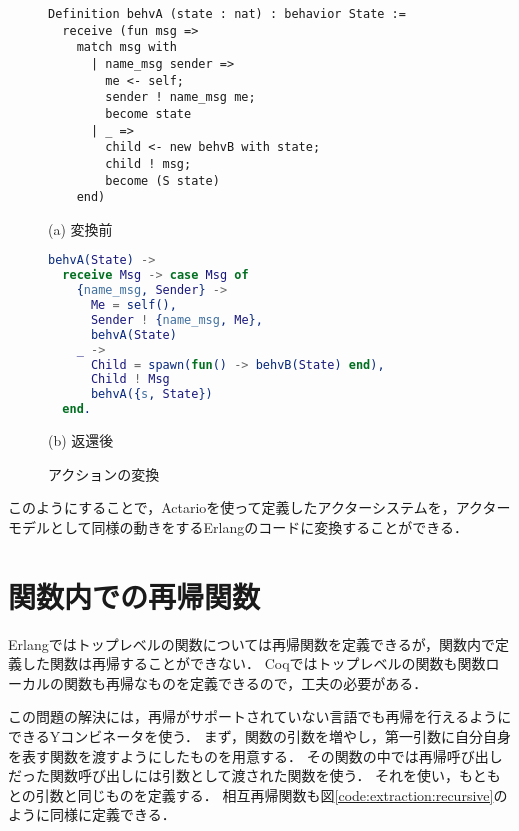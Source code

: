 \begin{figure}\centering
\begin{minipage}{1\textwidth}\centering
\begin{lstlisting}[frame=single,numbers=none,xleftmargin=0pt]
Definition behvA (state : nat) : behavior State :=
  receive (fun msg =>
    match msg with
      | name_msg sender =>
        me <- self;
        sender ! name_msg me;
        become state
      | _ =>
        child <- new behvB with state;
        child ! msg;
        become (S state)
    end)
\end{lstlisting}
(a) 変換前
\end{minipage}
\begin{minipage}{1\textwidth}\centering
\begin{lstlisting}[frame=single,numbers=none,xleftmargin=0pt,language=Erlang]
behvA(State) ->
  receive Msg -> case Msg of
    {name_msg, Sender} ->
      Me = self(),
      Sender ! {name_msg, Me},
      behvA(State)
    _ ->
      Child = spawn(fun() -> behvB(State) end),
      Child ! Msg
      behvA({s, State})
  end.
\end{lstlisting}
(b) 返還後
\end{minipage}
\label{code:extraction:action}
\caption{アクションの変換}
\end{figure}

このようにすることで，Actarioを使って定義したアクターシステムを，アクターモデルとして同様の動きをするErlangのコードに変換することができる．

\section{関数内での再帰関数}

Erlangではトップレベルの関数については再帰関数を定義できるが，関数内で定義した関数は再帰することができない．
Coqではトップレベルの関数も関数ローカルの関数も再帰なものを定義できるので，工夫の必要がある．

この問題の解決には，再帰がサポートされていない言語でも再帰を行えるようにできるYコンビネータを使う．
まず，関数の引数を増やし，第一引数に自分自身を表す関数を渡すようにしたものを用意する．
その関数の中では再帰呼び出しだった関数呼び出しには引数として渡された関数を使う．
それを使い，もともとの引数と同じものを定義する．
相互再帰関数も図\ref{code:extraction:recursive}のように同様に定義できる．

